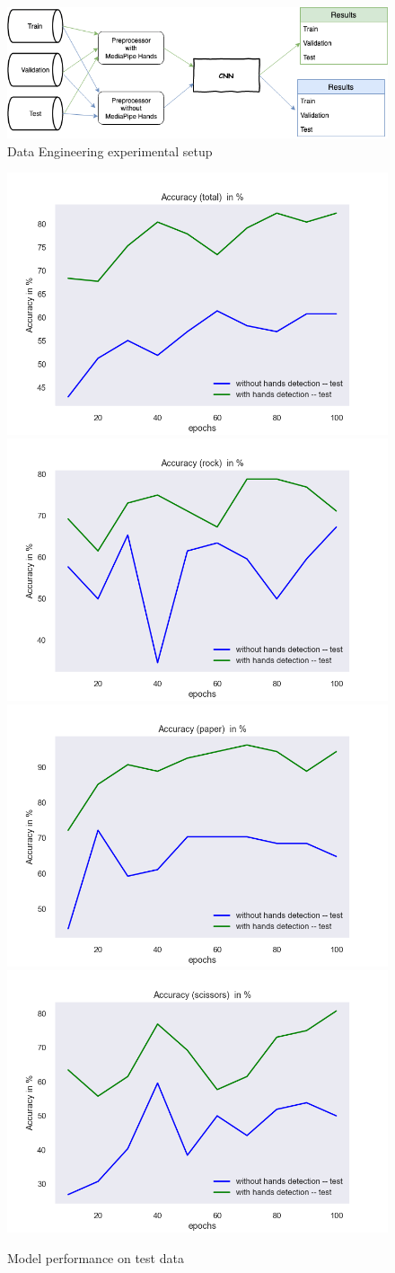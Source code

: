 \documentclass[a4paper]{article}
\begin{document}
\begin{figure}
    \includegraphics[width=.95\textwidth]{img/experiment/Experiment_Setup.png}
    \caption{Data Engineering experimental setup}
    \label{fig:exp-de-setup}
\end{figure}

\begin{figure}
    \includegraphics[width=.49\textwidth]{img/experiment/model_comp_10steps__test_acc_total.png}\hfill
    \includegraphics[width=.49\textwidth]{img/experiment/model_comp_10steps__test_acc_rock.png}\hfill
    \\[\smallskipamount]
    \includegraphics[width=.49\textwidth]{img/experiment/model_comp_10steps__test_acc_paper.png}\hfill
    \includegraphics[width=.49\textwidth]{img/experiment/model_comp_10steps__test_acc_scissors.png}\hfill
    \caption{Model performance on test data}
    \label{fig:exp-de-acc-test}
\end{figure}
\end{document}
